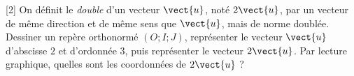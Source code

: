 \documentclass{exam}
\begin{document}
\begin{questions}
\vspace*{0.5cm}
[2]
On définit le \emph{double} d'un vecteur $\vect{u}$, noté $2\vect{u}$, par un vecteur de même direction et de même sens que $\vect{u}$, mais de norme doublée.
Dessiner un repère orthonormé $(O;I;J)$, représenter le vecteur $\vect{u}$ d'abscisse $2$ et d'ordonnée $3$, puis représenter le vecteur $2\vect{u}$. Par lecture graphique, quelles sont les coordonnées de $2\vect{u}$ ?
\end{questions}
\end{document}
